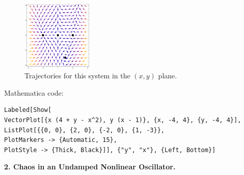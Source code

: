 \documentclass{article}
\theoremstyle{definition}
\begin{document}
\begin{figure}[!htb]
	\centering
	\includegraphics[width=0.3\textwidth]{problem1.eps}
	\caption{Trajectories for this system in the $(x,y)$ plane.}
\end{figure}


Mathematica code:
\begin{lstlisting}
Labeled[Show[
VectorPlot[{x (4 + y - x^2), y (x - 1)}, {x, -4, 4}, {y, -4, 4}],
ListPlot[{{0, 0}, {2, 0}, {-2, 0}, {1, -3}}, 
PlotMarkers -> {Automatic, 15}, 
PlotStyle -> {Thick, Black}]], {"y", "x"}, {Left, Bottom}]
\end{lstlisting}

\newpage

\noindent \textbf{2. Chaos in an Undamped Nonlinear Oscillator.}
\end{document}
